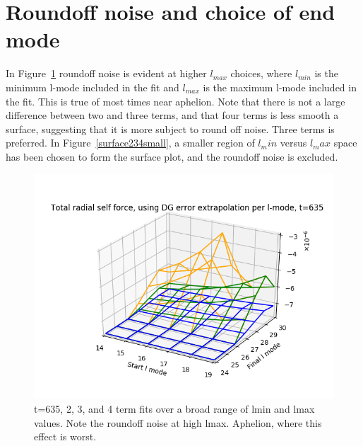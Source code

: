 \section{Roundoff noise and choice of end mode}

In Figure~\ref{surface234big} roundoff noise is evident at higher $l_{max}$ choices, where $l_{min}$ is the minimum l-mode included in the fit and $l_{max}$ is the maximum l-mode included in the fit. This is true of most times near aphelion. Note that there is not a large difference between two and three terms, and that four terms is less smooth a surface, suggesting that it is more subject to round off noise. Three terms is preferred. In Figure~\ref{surface234small}, a smaller region of $l_min$ versus $l_max$ space has been chosen to form the surface plot, and the roundoff noise is excluded.

\begin{figure}
  \includegraphics{bestfinflminlmax234terms635fullrange_perihelion}
  \caption{t=635, 2, 3, and 4 term fits over a broad range of lmin and lmax values. Note the roundoff noise at high lmax. Aphelion, where this effect is worst.}
  \label{surface234big}
\end{figure}

